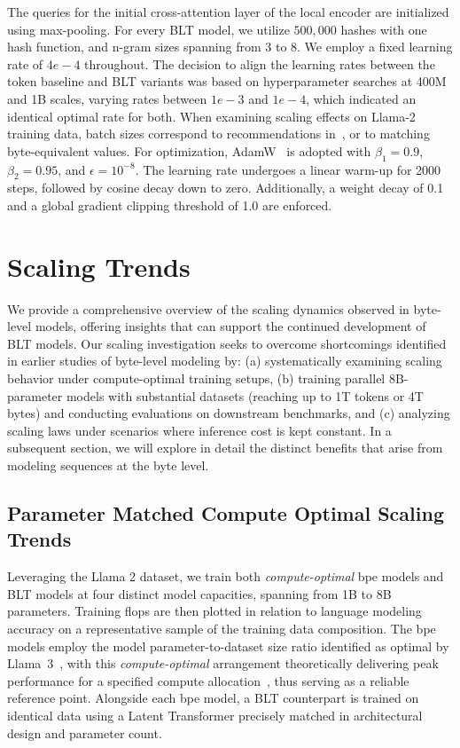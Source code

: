 The queries for the initial cross-attention layer of the local encoder are initialized using max-pooling. For every {\textsc BLT} model, we utilize $500,000$ hashes with one hash function, and n-gram sizes spanning from 3 to 8. We employ a fixed learning rate of $4e-4$ throughout. The decision to align the learning rates between the token baseline and {\textsc BLT} variants was based on hyperparameter searches at 400M and 1B scales, varying rates between $1e-3$ and $1e-4$, which indicated an identical optimal rate for both. When examining scaling effects on Llama-2 training data, batch sizes correspond to recommendations in~\cite{dubey2024llama}, or to matching byte-equivalent values. For optimization, AdamW~\citep{adamw} is adopted with $\beta_1 = 0.9$, $\beta_2 = 0.95$, and $\epsilon=10^{-8}$. The learning rate undergoes a linear warm-up for 2000 steps, followed by cosine decay down to zero. Additionally, a weight decay of 0.1 and a global gradient clipping threshold of 1.0 are enforced.

\section{Scaling Trends}
\label{section:scaling}

We provide a comprehensive overview of the scaling dynamics observed in byte-level models, offering insights that can support the continued development of {\textsc BLT} models. Our scaling investigation seeks to overcome shortcomings identified in earlier studies of byte-level modeling by: (a) systematically examining scaling behavior under compute-optimal training setups, (b) training parallel 8B-parameter models with substantial datasets (reaching up to 1T tokens or 4T bytes) and conducting evaluations on downstream benchmarks, and (c) analyzing scaling laws under scenarios where inference cost is kept constant. In a subsequent section, we will explore in detail the distinct benefits that arise from modeling sequences at the byte level.

\subsection{Parameter Matched Compute Optimal Scaling Trends}
\label{section:parameter-matched-scaling}
Leveraging the Llama 2 dataset, we train both \textit{compute-optimal} bpe models and {\textsc BLT} models at four distinct model capacities, spanning from 1B to 8B parameters. Training flops are then plotted in relation to language modeling accuracy on a representative sample of the training data composition. The bpe models employ the model parameter-to-dataset size ratio identified as optimal by Llama~3~\citep{dubey2024llama}, with this \textit{compute-optimal} arrangement theoretically delivering peak performance for a specified compute allocation~\citep{hoffmann2022training}, thus serving as a reliable reference point. Alongside each bpe model, a {\textsc BLT} counterpart is trained on identical data using a Latent Transformer precisely matched in architectural design and parameter count.

